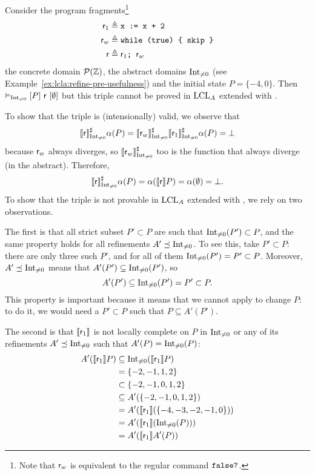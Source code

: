 \begin{example}\label{ex:lcla:refine-pre-incomplete}
	Consider the program fragments\footnote{Note that $\mathsf{r}_w$ is equivalent to the regular command $\texttt{false?}$.}
	\begin{align*}
		\mathsf{r}_1 &\triangleq \texttt{x := x + 2} \\
		\mathsf{r}_w &\triangleq \texttt{while (true) \{ skip \}} \\
		\mathsf{r} &\triangleq \mathsf{r}_1 \texttt{; }\mathsf{r}_w
	\end{align*}
	the concrete domain $\mathcal{P}(\mathbb{Z})$, the abstract domains $\text{Int}_{\neq 0}$ (see Example~\ref{ex:lcla:refine-pre-usefulness}) and the initial state $P = \{ -4, 0 \}$. 
	Then $\vDash_{\text{Int}_{\neq 0}}\nobreak[P]~\mathsf{r}~[\emptyset]$ but this triple cannot be proved in $\text{LCL}_A$ extended with .
	
	To show that the triple is (intensionally) valid, we observe that
	\[
	\llbracket\mathsf{r}\rrbracket^{\sharp}_{\text{Int}_{\neq 0}} \alpha(P) = \llbracket\mathsf{r}_w\rrbracket^{\sharp}_{\text{Int}_{\neq 0}} \llbracket\mathsf{r}_1\rrbracket^{\sharp}_{\text{Int}_{\neq 0}} \alpha(P) = \bot
	\]
	because $\mathsf{r}_w$ always diverges, so $\llbracket\mathsf{r}_w\rrbracket^{\sharp}_{\text{Int}_{\neq 0}}$ too is the function that always diverge (in the abstract). Therefore,
	\[
	\llbracket\mathsf{r}\rrbracket^{\sharp}_{\text{Int}_{\neq 0}} \alpha(P) = \alpha(\llbracket\mathsf{r}\rrbracket P) = \alpha(\emptyset) = \bot .
	\]
	To show that the triple is not provable in $\text{LCL}_A$ extended with , we rely on two observations.
	
	The first is that all strict subset $P' \subset P$ are such that $\text{Int}_{\neq 0}(P') \subset P$, and the same property holds for all refinements $A' \preceq \text{Int}_{\neq 0}$. To see this, take $P' \subset P$: there are only three such $P'$, and for all of them $\text{Int}_{\neq 0}(P') = P' \subset P$. Moreover, $A' \preceq \text{Int}_{\neq 0}$ means that $A'(P') \subseteq \text{Int}_{\neq 0}(P')$, so
	\[
	A'(P') \subseteq \text{Int}_{\neq 0}(P') = P' \subset P .
	\]
	This property is important because it means that we cannot apply  to change $P$: to do it, we would need a $P' \subset P$ such that $P \subseteq A'(P')$.
	
	The second is that $\llbracket\mathsf{r}_1\rrbracket$ is not locally complete on $P$ in $\text{Int}_{\neq 0}$ or any of its refinements $A' \preceq \text{Int}_{\neq 0}$ such that $A'(P) = \text{Int}_{\neq 0}(P)$:
	\begin{align*}
		A'(\llbracket\mathsf{r}_1\rrbracket P) &\subseteq \text{Int}_{\neq 0}(\llbracket\mathsf{r}_1\rrbracket P) \\
		&= \{ -2, -1, 1, 2 \} \\
		&\subset \{ -2, -1, 0, 1, 2 \} \\
		&\subseteq A'(\{ -2, -1, 0, 1, 2 \}) \\
		&= A'(\llbracket\mathsf{r}_1\rrbracket (\{ -4, -3, -2, -1, 0 \})) \\
		&= A'(\llbracket\mathsf{r}_1\rrbracket (\text{Int}_{\neq 0}(P))) \\
		&= A'(\llbracket\mathsf{r}_1\rrbracket A'(P))
	\end{align*}
	

\end{example}
